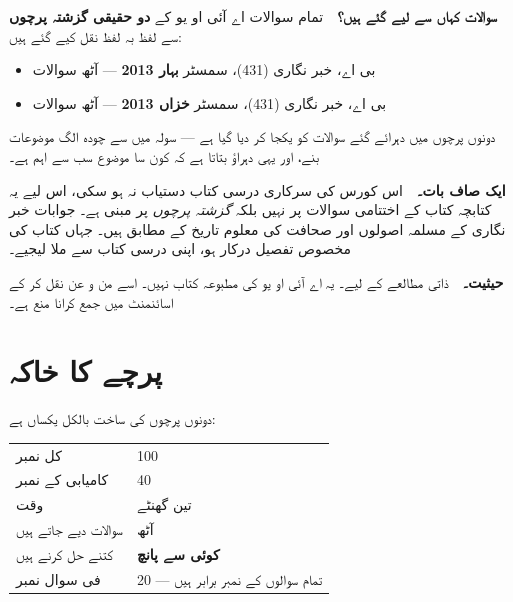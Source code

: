 \begin{tcolorbox}[enhanced, colback=white, colframe=bmblue, boxrule=0.6pt,
                  arc=3pt, left=12pt, right=12pt, top=10pt, bottom=10pt]
\textbf{\color{bmblue}سوالات کہاں سے لیے گئے ہیں؟}\ \
تمام سوالات اے آئی او یو کے \textbf{دو حقیقی گزشتہ پرچوں} سے لفظ بہ لفظ نقل
کیے گئے ہیں:

\smallskip
\begin{itemize}\setlength{\itemsep}{0pt}\setlength{\topsep}{2pt}
  \item بی اے، خبر نگاری (\textenglish{431})، سمسٹر \textbf{بہار
        \textenglish{2013}} --- آٹھ سوالات
  \item بی اے، خبر نگاری (\textenglish{431})، سمسٹر \textbf{خزاں
        \textenglish{2013}} --- آٹھ سوالات
\end{itemize}

\smallskip
دونوں پرچوں میں دہرائے گئے سوالات کو یکجا کر دیا گیا ہے --- سولہ میں سے چودہ
الگ موضوعات بنے، اور یہی دہراؤ بتاتا ہے کہ کون سا موضوع سب سے اہم ہے۔

\medskip
\textbf{\color{bmblue}ایک صاف بات۔}\ \
اس کورس کی سرکاری درسی کتاب دستیاب نہ ہو سکی، اس لیے یہ کتابچہ کتاب کے اختتامی
سوالات پر نہیں بلکہ \emph{گزشتہ پرچوں} پر مبنی ہے۔ جوابات خبر نگاری کے مسلمہ
اصولوں اور صحافت کی معلوم تاریخ کے مطابق ہیں۔ جہاں کتاب کی مخصوص تفصیل درکار
ہو، اپنی درسی کتاب سے ملا لیجیے۔

\medskip
\textbf{\color{bmblue}حیثیت۔}\ \
ذاتی مطالعے کے لیے۔ یہ اے آئی او یو کی مطبوعہ کتاب نہیں۔ اسے من و عن نقل کر کے
اسائنمنٹ میں جمع کرانا منع ہے۔
\end{tcolorbox}

\clearpage

\section*{پرچے کا خاکہ}

دونوں پرچوں کی ساخت بالکل یکساں ہے:

\medskip
\begin{center}
\begin{tabular}{@{}p{4.6cm} p{9.8cm}@{}}
\toprule
کل نمبر & \textenglish{100} \\
کامیابی کے نمبر & \textenglish{40} \\
وقت & تین گھنٹے \\
سوالات دیے جاتے ہیں & آٹھ \\
کتنے حل کرنے ہیں & \textbf{کوئی سے پانچ} \\
فی سوال نمبر & \textenglish{20} --- تمام سوالوں کے نمبر برابر ہیں \\
\bottomrule
\end{tabular}
\end{center}

